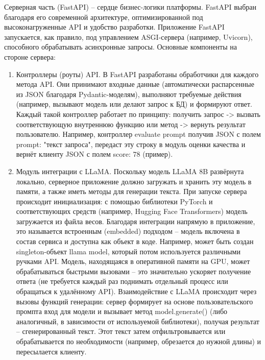 Серверная часть (FastAPI) – сердце бизнес-логики платформы. FastAPI выбран благодаря его современной архитектуре, оптимизированной под высоконагруженные API и удобство разработки. Приложение FastAPI запускается, как правило, под управлением ASGI-сервера (например, Uvicorn), способного обрабатывать асинхронные запросы. Основные компоненты на стороне сервера:
\begin{enumerate}[label=\arabic*.]
    \item Контроллеры (роуты) API. В FastAPI разработаны обработчики для каждого метода API. Они принимают входные данные (автоматически распарсенные из JSON благодаря Pydantic-моделям), выполняют требуемые действия (например, вызывают модель или делают запрос к БД) и формируют ответ. Каждый такой контроллер работает по принципу: получить запрос -> вызвать соответствующую внутреннюю функцию или метод -> вернуть результат пользователю. Например, контроллер evaluate prompt получив JSON с полем prompt: "текст запроса", передаст эту строку в модуль оценки качества и вернёт клиенту JSON с полем score: 78 (пример).
    \item Модуль интеграции с LLaMA. Поскольку модель LLaMA 8B развёрнута локально, серверное приложение должно загружать и хранить эту модель в памяти, а также иметь методы для генерации текста. При запуске сервера происходит инициализация: с помощью библиотеки PyTorch и соответствующих средств (например, Hugging Face Transformers) модель загружается из файла весов. Благодаря интеграции напрямую в приложение, это называется встроенным (embedded) подходом – модель включена в состав сервиса и доступна как объект в коде\cite{}. Например, может быть создан singleton-объект llama model, который потом используется различными ручками API. Модель, находящаяся в оперативной памяти на GPU, может обрабатываться быстрыми вызовами – это значительно ускоряет получение ответа (не требуется каждый раз поднимать отдельный процесс или обращаться к удалённому API). Взаимодействие с LLaMA происходит через вызовы функций генерации: сервер формирует на основе пользовательского промпта вход для модели и вызывает метод model.generate() (либо аналогичный, в зависимости от используемой библиотеки), получая результат – сгенерированный текст. Этот текст затем отфильтровывается или обрабатывается по необходимости (например, обрезается до нужной длины) и пересылается клиенту.

\end{enumerate}
